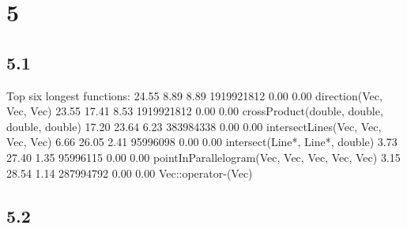 \documentclass[12pt]{article}
\begin{document}
\section{5}
\subsection{5.1}
Top six longest functions:
  24.55      8.89     8.89 1919921812     0.00     0.00  direction(Vec, Vec, Vec)
  23.55     17.41     8.53 1919921812     0.00     0.00  crossProduct(double, double, double, double)
  17.20     23.64     6.23 383984338     0.00     0.00  intersectLines(Vec, Vec, Vec, Vec)
   6.66     26.05     2.41 95996098     0.00     0.00  intersect(Line*, Line*, double)
   3.73     27.40     1.35 95996115     0.00     0.00  pointInParallelogram(Vec, Vec, Vec, Vec, Vec)
   3.15     28.54     1.14 287994792     0.00     0.00  Vec::operator-(Vec)


\subsection{5.2}
\end{document}
